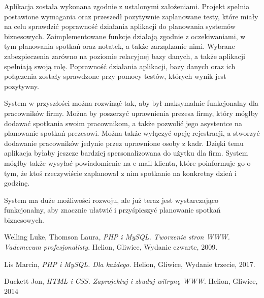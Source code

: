\documentclass[eng,printmode,openany,oneside]{mgr}
\begin{document}
Aplikacja została wykonana zgodnie z ustalonymi założeniami. Projekt spełnia postawione wymagania oraz przeszedł pozytywnie zaplanowane testy, które miały na celu sprawdzić poprawność działania aplikacji do planowania systemów biznesowych. Zaimplementowane funkcje działają zgodnie z oczekiwaniami, w tym planowania spotkań oraz notatek, a także zarządzanie nimi. Wybrane zabezpieczenia zarówno na poziomie relacyjnej bazy danych, a także aplikacji spełniają swoją rolę. Poprawność działania aplikacji, bazy danych oraz ich połączenia zostały sprawdzone przy pomocy testów, których wynik jest pozytywny.

System w przyszłości można rozwinąć tak, aby był maksymalnie funkcjonalny dla pracowników firmy. Można by poszerzyć uprawnienia prezesa firmy, który mógłby dodawać spotkania swoim pracownikom, a także pozwolić jego asystentce na planowanie spotkań prezesowi. Można także wyłączyć opcję rejestracji, a stworzyć dodawanie pracowników jedynie przez uprawnione osoby z kadr. Dzięki temu aplikacja byłaby jeszcze bardziej spersonalizowana do użytku dla firm. System mógłby także wysyłać powiadomienie na e-mail klienta, które poinformuje go o tym, że ktoś rzeczywiście zaplanował z nim spotkanie na konkretny dzień i godzinę. 

System ma duże możliwości rozwoju, ale już teraz jest wystarczająco funkcjonalny, aby znacznie ułatwić i przyśpieszyć planowanie spotkań biznesowych. 

\begin{thebibliography}{9}
  
  Welling Luke, Thomson Laura,
  \emph{PHP i MySQL. Tworzenie stron WWW. Vademecum profesjonalisty}.
  Helion, Gliwice,
  Wydanie czwarte,
  2009.
  
  Lis Marcin,
  \emph{PHP i MySQL. Dla każdego}.
  Helion, Gliwice,
  Wydanie trzecie,
  2017.
  
  Duckett Jon,
  \emph{HTML i CSS. Zaprojektuj i zbuduj witrynę WWW}.
  Helion, Gliwice,
  2014
  

  
\end{thebibliography}
\end{document}
